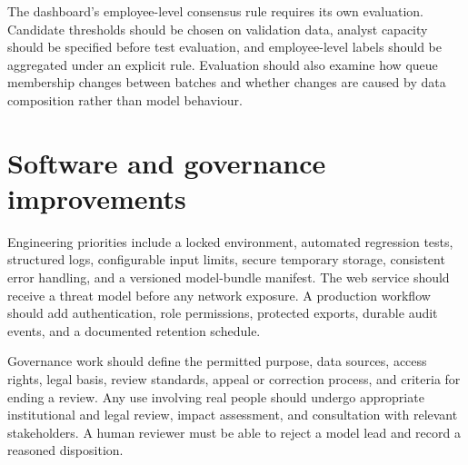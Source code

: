 The dashboard's employee-level consensus rule requires its own
evaluation. Candidate thresholds should be chosen on validation data,
analyst capacity should be specified before test evaluation, and
employee-level labels should be aggregated under an explicit rule.
Evaluation should also examine how queue membership changes between
batches and whether changes are caused by data composition rather
than model behaviour.

\section{Software and governance improvements}
Engineering priorities include a locked environment, automated
regression tests, structured logs, configurable input limits, secure
temporary storage, consistent error handling, and a versioned
model-bundle manifest. The web service should receive a threat model
before any network exposure. A production workflow should add
authentication, role permissions, protected exports, durable audit
events, and a documented retention schedule.

Governance work should define the permitted purpose, data sources,
access rights, legal basis, review standards, appeal or correction
process, and criteria for ending a review. Any use involving real
people should undergo appropriate institutional and legal review,
impact assessment, and consultation with relevant stakeholders. A
human reviewer must be able to reject a model lead and record a
reasoned disposition.
